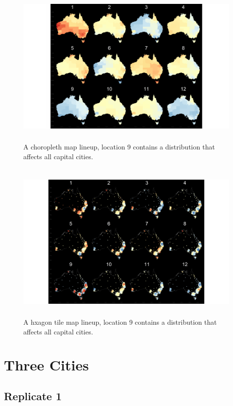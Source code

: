 \documentclass{monashthesis}
\begin{document}
\begin{figure}[H]
\centering
\includegraphics[height=8cm]{lineups/cities-geo9-1.pdf}
\caption{\label{fig:cities-geo9}A choropleth map lineup, location 9 contains a distribution that affects all capital cities.}
\end{figure}

\begin{figure}[H]
\centering
\includegraphics[height=8cm]{lineups/cities-hex9-1.pdf}
\caption{\label{fig:cities-hex9}A hxagon tile map lineup, location 9 contains a distribution that affects all capital cities.}
\end{figure}

\newpage

\hypertarget{three-cities}{%
\section{Three Cities}\label{three-cities}}

\hypertarget{replicate-1-1}{%
\subsection{Replicate 1}\label{replicate-1-1}}
\end{document}

